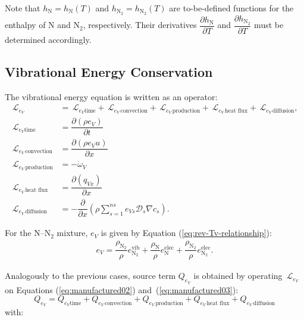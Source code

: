 \documentclass[10pt]{article}
\newcommand{\Diff}[2] {\dfrac{\partial( #1)}{\partial #2}}
\newcommand{\diff}[2] {\dfrac{\partial #1 }{\partial #2}}
\newcommand{\Lo}{\,\mathcal{L}}
\newcommand{\N}{\text{N}}
\newcommand{\elec}{\text{elec}}
\newcommand{\vib}{\text{vib}}
\newcommand{\convection}{\,\text{convection}}
\newcommand{\production}{\,\text{production}}
\newcommand{\diffusion}{\,\text{diffusion}}
\newcommand{\heatflux}{\,\text{heat flux}}
\begin{document}
Note that $h_\N=h_\N(T)$ and $h_{\N_2}=h_{\N_2}(T)$ are to-be-defined functions for the enthalpy of N and N$_2$, respectively.
Their derivatives $\diff{h_\N}{T}$ and $\diff{h_{\N_2}}{T}$ must be determined accordingly.



\subsection{Vibrational Energy Conservation}
The vibrational energy equation is written as an operator:
\begin{equation*}
 \label{eq:ns1d_15}
\begin{split}
\Lo_{e_V} &= \Lo_{e_V \text{time}} + \Lo_{e_V \convection} + \Lo_{e_V \production} + \Lo_{e_V \heatflux} + \Lo_{e_V \diffusion}
,\\
\Lo_{e_V \text{time}} &= \Diff{\rho e_V}{t}\\
\Lo_{e_V \convection} &= \Diff{\rho e_V u }{x}\\
\Lo_{e_V \production} &= -\dot{\omega}_V\\ 
\Lo_{e_V \heatflux} &= \Diff{q_{Vx}}{x}\\
\Lo_{e_V \diffusion}&= -\diff{ }{x}\left(\rho \sum_{s=1}^{ns} e_{Vs} \mathcal{D}_s \nabla{c_s}\right).
\end{split}
\end{equation*}

For the N--N$_2$ mixture, $e_V$ is given by Equation (\ref{eq:rev-Tv-relationship}):
\begin{equation*}
\begin{split}
e_V= \dfrac{\rho_{\N_2}}{\rho} e_{\N_2}^{\vib} + \dfrac{\rho_{\N}}{\rho} e_{\N}^{\elec} + \dfrac{\rho_{\N_2}}{\rho}
e_{\N_2}^{\elec}.
\end{split}
\end{equation*}


Analogously to the previous cases, source term $Q_{e_V}$ is obtained by operating $\Lo_{e_V}$ on Equations
(\ref{eq:manufactured02}) and~(\ref{eq:manufactured03}):
$$Q_{e_V} = Q_{e_V \text{time}} + Q_{e_V \convection} + Q_{e_V \production} + Q_{e_V \heatflux} + Q_{e_V \diffusion}$$
with:

%
\end{document}
